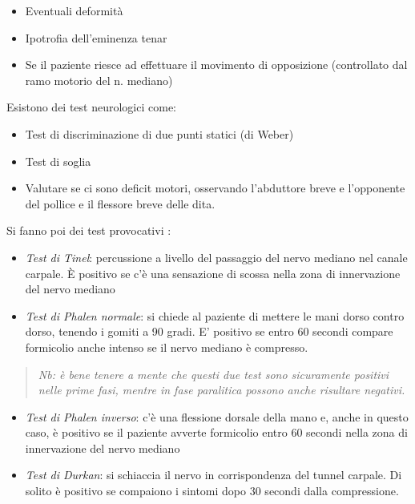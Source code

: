 \documentclass[]{article}
\begin{document}
\begin{itemize}
\item
  Eventuali deformità
\item
  Ipotrofia dell'eminenza tenar
\item
  Se il paziente riesce ad effettuare il movimento di opposizione
  (controllato dal ramo motorio del n. mediano)
\end{itemize}

Esistono dei test neurologici come:

\begin{itemize}
\item
  Test di discriminazione di due punti statici (di Weber)
\item
  Test di soglia
\item
  Valutare se ci sono deficit motori, osservando l'abduttore breve e
  l'opponente del pollice e il flessore breve delle dita.
\end{itemize}

Si fanno poi dei test provocativi :

\begin{itemize}
\item
  \emph{Test di Tinel}: percussione a livello del passaggio del nervo
  mediano nel canale carpale. È positivo se c'è una sensazione di scossa
  nella zona di innervazione del nervo mediano
\item
  \emph{Test di Phalen normale}: si chiede al paziente di mettere le
  mani dorso contro dorso, tenendo i gomiti a 90 gradi. E' positivo se
  entro 60 secondi compare formicolio anche intenso se il nervo mediano
  è compresso.
\end{itemize}

\begin{quote}
\emph{\emph{Nb: è bene tenere a mente che questi due test sono
sicuramente positivi nelle prime fasi, mentre in fase paralitica possono
anche risultare negativi.}}
\end{quote}

\begin{itemize}
\item
  \emph{Test di Phalen inverso}: c'è una flessione dorsale della mano e,
  anche in questo caso, è positivo se il paziente avverte formicolio
  entro 60 secondi nella zona di innervazione del nervo mediano
\item
  \emph{Test di Durkan}: si schiaccia il nervo in corrispondenza del
  tunnel carpale. Di solito è positivo se compaiono i sintomi dopo 30
  secondi dalla compressione.
\end{itemize}
\end{document}
